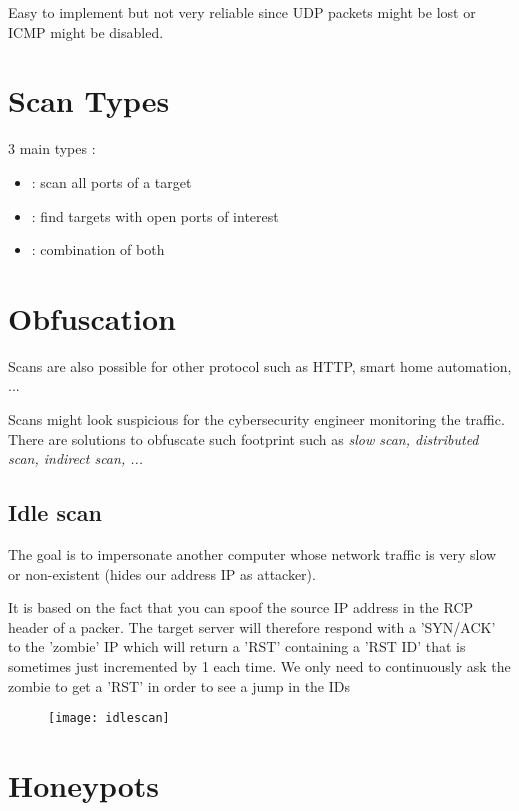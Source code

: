 Easy to implement but not very reliable since UDP packets might be lost or ICMP might be disabled.

\newpage
\section{Scan Types}

3 main types :
\begin{itemize}
    \item {} : scan all ports of a target
    \item {} : find targets with open ports of interest
    \item {} : combination of both
\end{itemize}

\section{Obfuscation}

Scans are also possible for other protocol such as HTTP, smart home automation, ...

Scans might look suspicious for the cybersecurity engineer monitoring the traffic. There are solutions to obfuscate such footprint such as \textit{slow scan, distributed scan, indirect scan, ...}

\subsection{Idle scan}

The goal is to impersonate another computer whose network traffic is very slow or non-existent (hides our address IP as attacker).

It is based on the fact that you can spoof the source IP address in the RCP header of a packer. The target server will therefore respond with a 'SYN/ACK' to the 'zombie' IP which will return a 'RST' containing a 'RST ID' that is sometimes just incremented by 1 each time. We only need to continuously ask the zombie to get a 'RST' in order to see a jump in the IDs

\begin{figure}[H]
    \centering
    \texttt{[image: idlescan]}
\end{figure}

\section{Honeypots}

